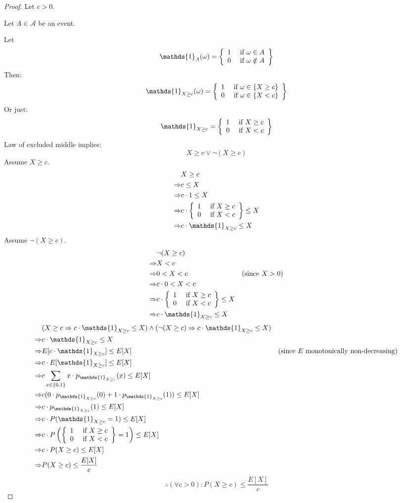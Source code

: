 \documentclass{article}
\begin{document}
\begin{proof}
Let \(c>0\).

Let \(A\in\mathcal{A}\) be an event.

Let
\[\mathds{1}_A(\omega)=\casesiie{1}{\omega\in A}{0}{\omega \notin A}\]
Then:
\[\mathds{1}_{X\geq c}(\omega)=\casesiie{1}{\omega\in \{X\geq c\}}{0}{\omega\in\{X<c\}}\]
Or just:
\[\mathds{1}_{X\geq c}=\casesiie{1}{X\geq c}{0}{X<c}\]
Law of excluded middle implies:
\[X \geq c \vee \neg(X \geq c)\]
Assume \(X\geq c\).
\begin{align*}
    & X\geq c \\
    \Rightarrow& c\leq X \\
    \Rightarrow& c\cdot 1\leq X \\
    \Rightarrow& c\cdot \casesiie{1}{X\geq c}{0}{X<c}\leq X \\
    \Rightarrow& c\cdot \mathds{1}_{X\geq c}\leq X \\
\end{align*}
Assume \(\neg(X\geq c)\).
\begin{align*}
    & \neg(X\geq c) \\
    \Rightarrow& X<c \\
    \Rightarrow& 0<X<c & (\text{since }X>0) \\
    \Rightarrow& c\cdot 0<X<c \\
    \Rightarrow& c\cdot \casesiie{1}{X\geq c}{0}{X<c} \leq X \\
    \Rightarrow& c\cdot \mathds{1}_{X\geq c}\leq X \\
\end{align*}
\begin{align*}
    & (X\geq c \Rightarrow c\cdot \mathds{1}_{X\geq c}\leq X) \wedge (\neg(X\geq c) \Rightarrow c\cdot \mathds{1}_{X\geq c}\leq X) \\
    \Rightarrow& c\cdot \mathds{1}_{X\geq c}\leq X \\
    \Rightarrow& E[c\cdot \mathds{1}_{X\geq c}]\leq E[X] & (\text{since } E\text{ monotonically non-decreasing}) \\
    \Rightarrow& c\cdot E[\mathds{1}_{X\geq c}]\leq E[X] \\
    \Rightarrow& c\sum_{x\in \{0,1\}} x\cdot p_{\mathds{1}_{X\geq c}}(x)\leq E[X] \\
    \Rightarrow& c (0\cdot p_{\mathds{1}_{X\geq c}}(0)+1\cdot p_{\mathds{1}_{X\geq c}}(1))\leq E[X] \\
    \Rightarrow& c\cdot p_{\mathds{1}_{X\geq c}}(1)\leq E[X] \\
    \Rightarrow& c\cdot P(\mathds{1}_{X\geq c}=1)\leq E[X] \\
    \Rightarrow& c\cdot P\left(\casesiie{1}{X\geq c}{0}{X<c}=1\right)\leq E[X] \\
    \Rightarrow& c\cdot P(X\geq c)\leq E[X] \\
    \Rightarrow& P(X\geq c)\leq \frac{E[X]}{c} \\
\end{align*}
\[\therefore (\forall c>0):P(X\geq c)\leq \frac{E[X]}{c}\]
\end{proof}
\end{document}
